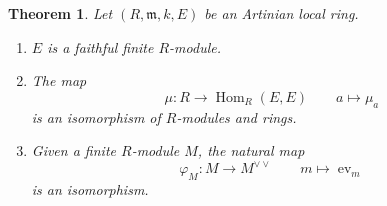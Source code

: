 \documentclass[10pt]{article}
\theoremstyle{thmstyle}
\newtheorem{theorem}{Theorem}[section]
\theoremstyle{defstyle}
\newcommand{\Hom}{\operatorname{Hom}}
\newcommand{\frakm}{\mathfrak{m}} %
\newcommand{\ev}{\operatorname{ev}}
\begin{document}
\begin{theorem}
    Let $(R,\frakm, k, E)$ be an Artinian local ring.
    \begin{enumerate}[label=(\arabic*)]
        \item $E$ is a faithful finite $R$-module.
        \item The map 
        \begin{equation*}
            \mu: R\longrightarrow \Hom_R(E, E)\qquad a\longmapsto\mu_a
        \end{equation*}
        is an isomorphism of $R$-modules and rings.
        \item Given a finite $R$-module $M$, the natural map 
        \begin{equation*}
            \varphi_M: M\longrightarrow M^{\vee\vee}\qquad m\longmapsto\ev_m
        \end{equation*}
        is an isomorphism.
    \end{enumerate}
\end{theorem}
\end{document}
